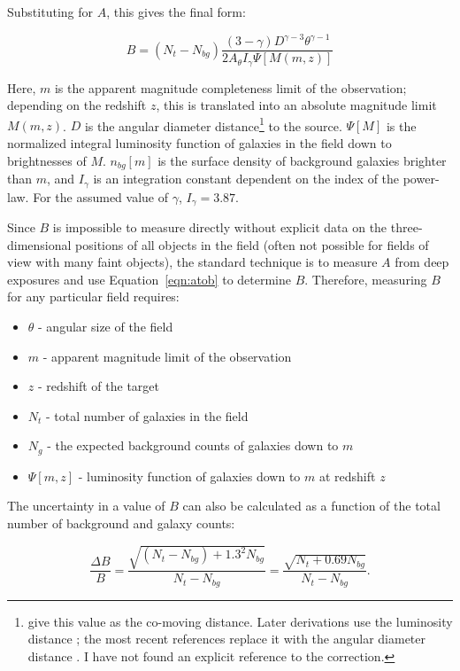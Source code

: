\documentclass{emulateapj}
\begin{document}
Substituting for $A$, this gives the final form:

\begin{equation}
\label{eqn:bgb}
B = (N_t - N_{bg})\frac{(3-\gamma) D^{\gamma-3} \theta^{\gamma-1}}{2 A_\theta I_\gamma \Psi[M(m,z)]}
\end{equation}

\noindent Here, $m$ is the apparent magnitude completeness limit of the observation; depending on the redshift $z$, this is translated into an absolute magnitude limit $M(m,z)$. $D$ is the angular diameter distance\footnote{\citet{lon79} give this value as the co-moving distance. Later derivations use the luminosity distance \citep[eg,][]{yee87,ell91}; the most recent references replace it with the angular diameter distance \citep{yee99,muz07,zau07}. I have not found an explicit reference to the correction.} to the source. $\Psi[M]$ is the normalized integral luminosity function of galaxies in the field down to brightnesses of $M$. $n_{bg}[m]$ is the surface density of background galaxies brighter than $m$, and $I_\gamma$ is an integration constant dependent on the index of the power-law. For the assumed value of $\gamma$, $I_\gamma=3.87$.  

Since $B$ is impossible to measure directly without explicit data on the three-dimensional positions of all objects in the field (often not possible for fields of view with many faint objects), the standard technique is to measure $A$ from deep exposures and use Equation~\ref{eqn:atob} to determine $B$. Therefore, measuring $B$ for any particular field requires:

\begin{itemize}
    \item $\theta$ - angular size of the field
    \item $m$ - apparent magnitude limit of the observation
    \item $z$ - redshift of the target
    \item $N_t$ - total number of galaxies in the field
    \item $N_g$ - the expected background counts of galaxies down to $m$
    \item $\Psi[m,z]$ - luminosity function of galaxies down to $m$ at redshift $z$
\end{itemize}

The uncertainty in a value of $B$ can also be calculated as a function of the total number of background and galaxy counts:

\begin{equation}
\label{eqn:deltab}
\frac{\Delta B}{B} = \frac{\sqrt{(N_t - N_{bg}) + 1.3^2 N_{bg}}}{N_t - N_{bg}} = \frac{\sqrt{N_t + 0.69 N_{bg}}}{N_t - N_{bg}}.
\end{equation}
\end{document}
